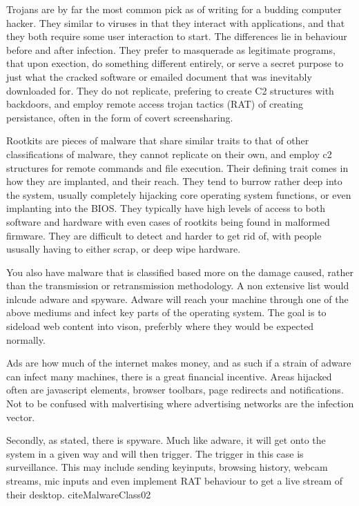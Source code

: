 Trojans are by far the most common pick as of writing for a budding computer hacker. They similar to viruses in that they interact with applications, and that they both require some user interaction to start. The differences lie in behaviour before and after infection. 
They prefer to masquerade as legitimate programs, that upon exection, do something different entirely, or serve a secret purpose to just what the cracked software or emailed document that was inevitably downloaded for. They do not replicate, prefering to create C2 structures with backdoors,
and employ remote access trojan tactics (RAT) of creating persistance, often in the form of covert screensharing. \citep{virusVsTrojan}


Rootkits are pieces of malware that share similar traits to that of other classifications of malware, they cannot replicate on their own, and employ c2 structures for remote commands and file execution. 
Their defining trait comes in how they are implanted, and their reach. They tend to burrow rather deep into the system, usually completely hijacking core operating system functions, or even implanting into the BIOS.
They typically have high levels of access to both software and hardware with even cases of rootkits being found in malformed firmware. They are difficult to detect and harder to get rid of, with people ususally having to either scrap, or deep
wipe hardware. \cite{MalwareClass02} 

You also have malware that is classified based more on the damage caused, rather than the transmission or retransmission methodology. A non extensive list would inlcude adware and spyware. Adware will reach your machine through one of the above mediums
and infect key parts of the operating system. The goal is to sideload web content into vison, preferbly where they would be expected normally. 

Ads are how much of the internet makes money, and as such if a strain of adware can infect many machines, there is a great financial incentive.
Areas hijacked often are javascript elements, browser toolbars, page redirects and notifications. Not to be confused with malvertising where advertising networks are the infection vector. \citep{MalwareClass} 

Secondly, as stated, there is spyware. Much like adware, it will get onto the system in a given way and will then trigger. The trigger in this case is surveillance. This may include sending
keyinputs, browsing history, webcam streams, mic inputs and even implement RAT behaviour to get a live stream of their desktop. cite{MalwareClass02}  \citep{MalwareClass} 

